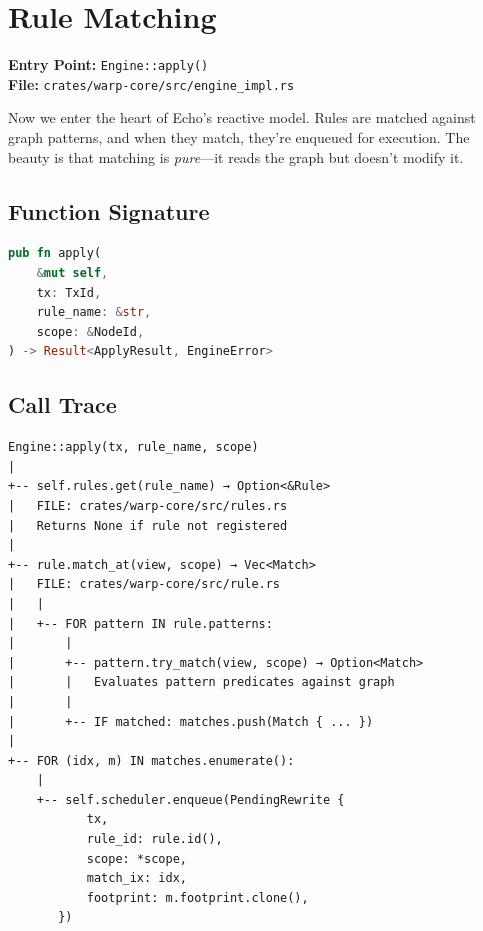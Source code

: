 
\chapter{Rule Matching}
\label{chap:tour-rules}

\textbf{Entry Point:} \texttt{Engine::apply()} \\
\textbf{File:} \texttt{crates/warp-core/src/engine\_impl.rs}

\begin{bigpicture}
Now we enter the heart of Echo's reactive model. Rules are matched against graph patterns, and when they match, they're enqueued for execution. The beauty is that matching is \emph{pure}---it reads the graph but doesn't modify it.
\end{bigpicture}

\section{Function Signature}

\begin{lstlisting}[language=Rust]
pub fn apply(
    &mut self,
    tx: TxId,
    rule_name: &str,
    scope: &NodeId,
) -> Result<ApplyResult, EngineError>
\end{lstlisting}

\section{Call Trace}

\begin{verbatim}
Engine::apply(tx, rule_name, scope)
|
+-- self.rules.get(rule_name) → Option<&Rule>
|   FILE: crates/warp-core/src/rules.rs
|   Returns None if rule not registered
|
+-- rule.match_at(view, scope) → Vec<Match>
|   FILE: crates/warp-core/src/rule.rs
|   |
|   +-- FOR pattern IN rule.patterns:
|       |
|       +-- pattern.try_match(view, scope) → Option<Match>
|       |   Evaluates pattern predicates against graph
|       |
|       +-- IF matched: matches.push(Match { ... })
|
+-- FOR (idx, m) IN matches.enumerate():
    |
    +-- self.scheduler.enqueue(PendingRewrite {
           tx,
           rule_id: rule.id(),
           scope: *scope,
           match_ix: idx,
           footprint: m.footprint.clone(),
       })
\end{verbatim}

